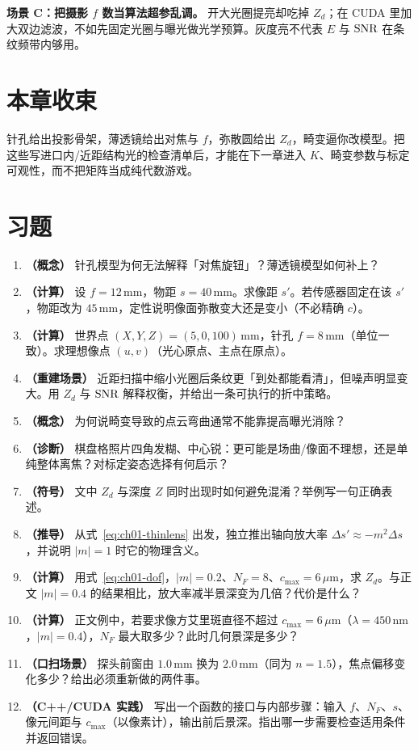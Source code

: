 \textbf{场景 C：把摄影 $f$ 数当算法超参乱调。} 开大光圈提亮却吃掉 $Z_d$；在 CUDA 里加大双边滤波，不如先固定光圈与曝光做光学预算。灰度亮不代表 $E$ 与 $\mathrm{SNR}$ 在条纹频带内够用。


\section*{本章收束}
针孔给出投影骨架，薄透镜给出对焦与 $f$，弥散圆给出 $Z_d$，畸变逼你改模型。把这些写进口内/近距结构光的检查清单后，才能在下一章进入 $K$、畸变参数与标定可观性，而不把矩阵当成纯代数游戏。

\section{习题}
\label{sec:ch01-exercises}

\begin{enumerate}
  \item \textbf{（概念）} 针孔模型为何无法解释「对焦旋钮」？薄透镜模型如何补上？
  \item \textbf{（计算）} 设 $f=12\,\mathrm{mm}$，物距 $s=40\,\mathrm{mm}$。求像距 $s'$。若传感器固定在该 $s'$，物距改为 $45\,\mathrm{mm}$，定性说明像面弥散变大还是变小（不必精确 $c$）。
  \item \textbf{（计算）} 世界点 $(X,Y,Z)=(5,0,100)\,\mathrm{mm}$，针孔 $f=8\,\mathrm{mm}$（单位一致）。求理想像点 $(u,v)$（光心原点、主点在原点）。
  \item \textbf{（重建场景）} 近距扫描中缩小光圈后条纹更「到处都能看清」，但噪声明显变大。用 $Z_d$ 与 $\mathrm{SNR}$ 解释权衡，并给出一条可执行的折中策略。
  \item \textbf{（概念）} 为何说畸变导致的点云弯曲通常不能靠提高曝光消除？
  \item \textbf{（诊断）} 棋盘格照片四角发糊、中心锐：更可能是场曲/像面不理想，还是单纯整体离焦？对标定姿态选择有何启示？
  \item \textbf{（符号）} 文中 $Z_d$ 与深度 $Z$ 同时出现时如何避免混淆？举例写一句正确表述。
  \item \textbf{（推导）} 从式~\eqref{eq:ch01-thinlens} 出发，独立推出轴向放大率 $\Delta s'\approx-m^2\Delta s$，并说明 $|m|=1$ 时它的物理含义。
  \item \textbf{（计算）} 用式~\eqref{eq:ch01-dof}，$|m|=0.2$、$N_F=8$、$c_{\max}=6\,\mu\mathrm{m}$，求 $Z_d$。与正文 $|m|=0.4$ 的结果相比，放大率减半景深变为几倍？代价是什么？
  \item \textbf{（计算）} 正文例中，若要求像方艾里斑直径不超过 $c_{\max}=6\,\mu\mathrm{m}$（$\lambda=450\,\mathrm{nm}$，$|m|=0.4$），$N_F$ 最大取多少？此时几何景深是多少？
  \item \textbf{（口扫场景）} 探头前窗由 $1.0\,\mathrm{mm}$ 换为 $2.0\,\mathrm{mm}$（同为 $n=1.5$），焦点偏移变化多少？给出必须重新做的两件事。
  \item \textbf{（C++/CUDA 实践）} 写出一个函数的接口与内部步骤：输入 $f$、$N_F$、$s$、像元间距与 $c_{\max}$（以像素计），输出前后景深。指出哪一步需要检查适用条件并返回错误。
\end{enumerate}


